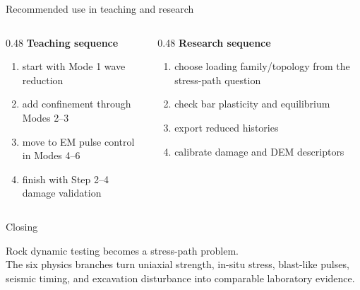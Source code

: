 \documentclass[11pt,aspectratio=169]{beamer}
\begin{document}
\begin{frame}{Recommended use in teaching and research}
  \begin{columns}[T,onlytextwidth]
    \begin{column}{0.48\textwidth}
      \textbf{Teaching sequence}
      \begin{enumerate}
        \item start with Mode 1 wave reduction
        \item add confinement through Modes 2--3
        \item move to EM pulse control in Modes 4--6
        \item finish with Step 2--4 damage validation
      \end{enumerate}
    \end{column}
    \begin{column}{0.48\textwidth}
      \textbf{Research sequence}
      \begin{enumerate}
        \item choose loading family/topology from the stress-path question
        \item check bar plasticity and equilibrium
        \item export reduced histories
        \item calibrate damage and DEM descriptors
      \end{enumerate}
    \end{column}
  \end{columns}
\end{frame}

\begin{frame}{Closing}
  \begin{center}
    \Large Rock dynamic testing becomes a stress-path problem.\\[6pt]
    \normalsize The six physics branches turn uniaxial strength, in-situ stress,
    blast-like pulses, seismic timing, and excavation disturbance into
    comparable laboratory evidence.
  \end{center}
\end{frame}
\end{document}
